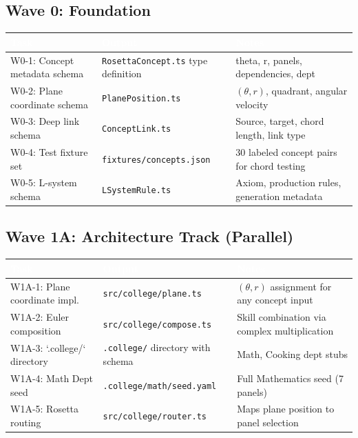 \documentclass[11pt,letterpaper]{article}
\newcommand{\tableheader}[1]{\textbf{\sffamily\textcolor{white}{#1}}}
\begin{document}
\subsection{Wave 0: Foundation}

\begin{center}
\begin{tabularx}{\textwidth}{L{3cm}L{4cm}X}
\toprule
{}
\tableheader{Task} & \tableheader{Output} & \tableheader{Notes} \\
\midrule
W0-1: Concept metadata schema & \texttt{RosettaConcept.ts} type definition & theta, r, panels, dependencies, dept \\
W0-2: Plane coordinate schema & \texttt{PlanePosition.ts} & $(\theta, r)$, quadrant, angular velocity \\
W0-3: Deep link schema & \texttt{ConceptLink.ts} & Source, target, chord length, link type \\
W0-4: Test fixture set & \texttt{fixtures/concepts.json} & 30 labeled concept pairs for chord testing \\
W0-5: L-system schema & \texttt{LSystemRule.ts} & Axiom, production rules, generation metadata \\
\bottomrule
\end{tabularx}
\end{center}

\subsection{Wave 1A: Architecture Track (Parallel)}

\begin{center}
\begin{tabularx}{\textwidth}{L{3cm}L{3cm}X}
\toprule
{}
\tableheader{Task} & \tableheader{Output} & \tableheader{Notes} \\
\midrule
W1A-1: Plane coordinate impl. & \texttt{src/college/plane.ts} & $(θ,r)$ assignment for any concept input \\
W1A-2: Euler composition & \texttt{src/college/compose.ts} & Skill combination via complex multiplication \\
W1A-3: `.college/` directory & \texttt{.college/} directory with schema & Math, Cooking dept stubs \\
W1A-4: Math Dept seed & \texttt{.college/math/seed.yaml} & Full Mathematics seed (7 panels) \\
W1A-5: Rosetta routing & \texttt{src/college/router.ts} & Maps plane position to panel selection \\
\bottomrule
\end{tabularx}
\end{center}
\end{document}
